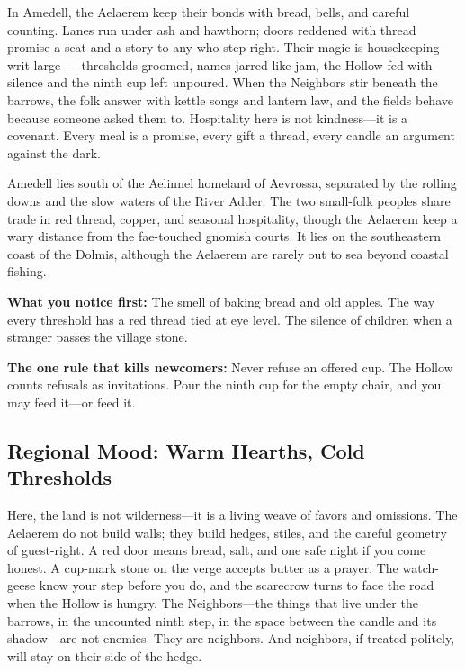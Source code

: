 \vspace{2mm}
\begin{tcolorbox}[colback=black!3,colframe=blue!60!black,title={Theme \& Atmosphere},breakable]
In Amedell, the Aelaerem keep their bonds with bread, bells, and careful counting. Lanes run under ash and hawthorn; doors reddened with thread promise a seat and a story to any who step right. Their magic is housekeeping writ large --- thresholds groomed, names jarred like jam, the Hollow fed with silence and the ninth cup left unpoured. When the Neighbors stir beneath the barrows, the folk answer with kettle songs and lantern law, and the fields behave because someone asked them to. Hospitality here is not kindness---it is a covenant. Every meal is a promise, every gift a thread, every candle an argument against the dark.

Amedell lies south of the Aelinnel homeland of Aevrossa, separated by the rolling downs and the slow waters of the River Adder. The two small-folk peoples share trade in red thread, copper, and seasonal hospitality, though the Aelaerem keep a wary distance from the fae-touched gnomish courts. It lies on the southeastern coast of the Dolmis, although the Aelaerem are rarely out to sea beyond coastal fishing.

\vspace{2mm}
\textbf{What you notice first:} The smell of baking bread and old apples. The way every threshold has a red thread tied at eye level. The silence of children when a stranger passes the village stone.

\textbf{The one rule that kills newcomers:} Never refuse an offered cup. The Hollow counts refusals as invitations. Pour the ninth cup for the empty chair, and you may feed it---or feed it.
\end{tcolorbox}

\subsection*{Regional Mood: Warm Hearths, Cold Thresholds}

Here, the land is not wilderness---it is a living weave of favors and omissions. The Aelaerem do not build walls; they build hedges, stiles, and the careful geometry of guest-right. A red door means bread, salt, and one safe night if you come honest. A cup-mark stone on the verge accepts butter as a prayer. The watch-geese know your step before you do, and the scarecrow turns to face the road when the Hollow is hungry. The Neighbors---the things that live under the barrows, in the uncounted ninth step, in the space between the candle and its shadow---are not enemies. They are neighbors. And neighbors, if treated politely, will stay on their side of the hedge.

